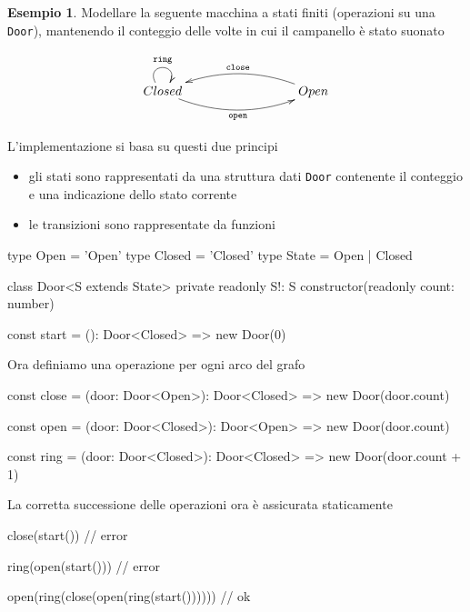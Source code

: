 \documentclass[12pt]{article}
\theoremstyle{definition}
\newtheorem{example}{Esempio}[subsection]
\newenvironment{code}
  {\vspace{0.5cm} \VerbatimEnvironment\begin{typescriptcode}}
  {\end{typescriptcode} \vspace{0.2cm}}
\begin{document}
\begin{example}
Modellare la seguente macchina a stati finiti (operazioni su una \texttt{Door}), mantenendo il conteggio delle
volte in cui il campanello è stato suonato

\[
\xymatrixrowsep{3cm}
\xymatrixcolsep{3cm}
\xymatrix{
  Closed \ar@/_0.5cm/[r]_{\texttt{open}} \ar@(ul,ur)^{\texttt{ring}} & Open \ar@/_0.5cm/[l]_{\texttt{close}} \\
}
\]

L'implementazione si basa su questi due principi

\begin{itemize}
\item gli stati sono rappresentati da una struttura dati \texttt{Door} contenente il conteggio e una indicazione dello stato corrente
\item le transizioni sono rappresentate da funzioni
\end{itemize}

\begin{code}
type Open = 'Open'
type Closed = 'Closed'
type State = Open | Closed

class Door<S extends State> {
  private readonly S!: S
  constructor(readonly count: number) {}
}

const start = (): Door<Closed> => new Door(0)
\end{code}

Ora definiamo una operazione per ogni arco del grafo

\begin{code}
const close = (door: Door<Open>): Door<Closed> =>
  new Door(door.count)

const open = (door: Door<Closed>): Door<Open> =>
  new Door(door.count)

const ring = (door: Door<Closed>): Door<Closed> =>
  new Door(door.count + 1)
\end{code}

La corretta successione delle operazioni ora è assicurata staticamente

\begin{code}
close(start()) // error

ring(open(start())) // error

open(ring(close(open(ring(start()))))) // ok
\end{code}
\end{example}
\end{document}
